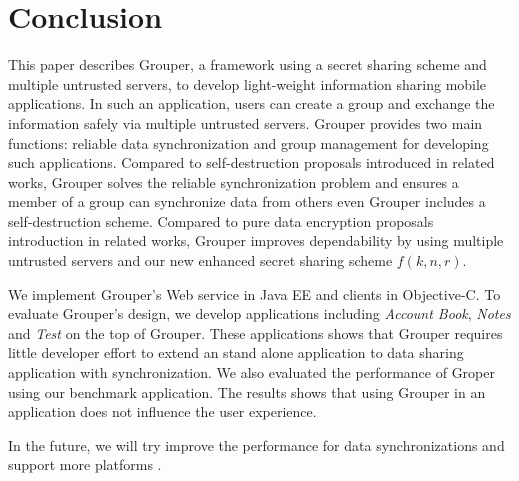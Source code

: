 \documentclass[twocolumn,10pt]{article}
\begin{document}
\section{Conclusion}

This paper describes Grouper, a framework using a secret sharing scheme and multiple untrusted servers, to develop light-weight information sharing mobile applications.
In such an application, users can create a group and exchange the information safely via multiple untrusted servers.
Grouper provides two main functions: reliable data synchronization and group management for developing such applications.
Compared to self-destruction proposals introduced in related works, Grouper solves the reliable synchronization problem and ensures a member of a group can synchronize data from others even Grouper includes a self-destruction scheme.
Compared to pure data encryption proposals introduction in related works, Grouper improves dependability by using multiple untrusted servers and our new enhanced secret sharing scheme $f(k, n, r)$.

We implement Grouper's Web service in Java EE and clients in Objective-C. 
To evaluate Grouper's design, we develop applications including \emph{Account Book}, \emph{Notes} and \emph{Test} on the top of Grouper.
These applications shows that Grouper requires little developer effort to extend an stand alone application to data sharing application with synchronization.
We also evaluated the performance of Groper using our benchmark application.
The results shows that using Grouper in an application does not influence the user experience.

In the future, we will try improve the performance for data synchronizations and support more platforms .


{
	\footnotesize
	
}
\end{document}
